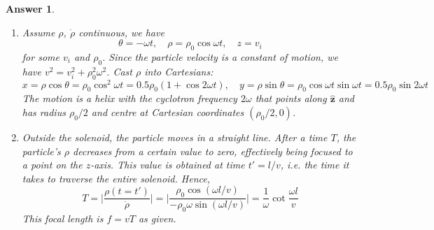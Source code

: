 \documentclass[a4paper]{article}
\newtheorem{ans}{Answer}[section]
\theoremstyle{new}
\begin{document}
\begin{ans}
\begin{enumerate}[label=(\alph*)]
where the $B$ term is zero outside. Now, $\dot{\theta}=-\frac{qB}{2\gamma m}$ inside. Let this be $\dot{\theta}:=-\omega$, then we have
$$\gamma m\ddot{\rho}=m\gamma\rho\omega^2+q\rho B\bigg(-\frac{qB}{2\gamma m}\bigg)=-\frac{q^2B^2\rho}{4m\gamma}$$
We thus have the simple harmonic motion equation for $\rho$, i.e. $\ddot{\rho}=-\rho\omega^2$.
\item Assume $\rho$, $\dot{\rho}$ continuous, we have
$$\theta=-\omega t,\quad\rho=\rho_0\cos\omega t,\quad z=v_i$$
for some $v_i$ and $\rho_0$. Since the particle velocity is a constant of motion, we have $v^2=v_i^2+\rho_0^2\omega^2$. Cast $\rho$ into Cartesians:
$$x=\rho\cos\theta=\rho_0\cos^2\omega t=0.5\rho_0(1+\cos2\omega t),\quad y=\rho\sin\theta=\rho_0\cos\omega t\sin\omega t=0.5\rho_0\sin2\omega t$$
The motion is a helix with the cyclotron frequency $2\omega$ that points along $\mathbf{\hat{z}}$ and has radius $\rho_0/2$ and centre at Cartesian coordinates $(\rho_0/2,0)$.
\item Outside the solenoid, the particle moves in a straight line. After a time $T$, the particle's $\rho$ decreases from a certain value to zero, effectively being focused to a point on the $z$-axis. This value is obtained at time $t'=l/v$, i.e. the time it takes to traverse the entire solenoid. Hence,
$$T=\bigg|\frac{\rho(t=t')}{\dot{\rho}}\bigg|=\bigg|\frac{\rho_0\cos(\omega l/v)}{-\rho_0\omega\sin(\omega l/v)}\bigg|=\frac{1}{\omega}\cot\frac{\omega l}{v}$$
This focal length is $f=vT$ as given.
\end{enumerate}
\end{ans}
\newpage
\end{document}
